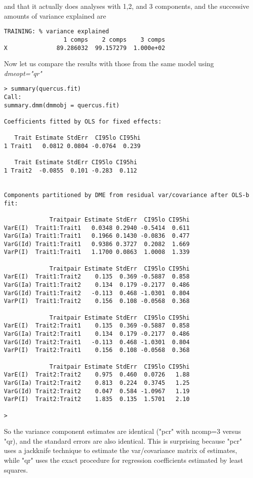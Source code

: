 \documentclass[titlepage]{article}  %
\begin{document}
and that it actually does analyses with 1,2, and 3 components, and the successive amounts of variance explained are

\begin{verbatim}
TRAINING: % variance explained
                 1 comps    2 comps    3 comps
X              89.286032  99.157279  1.000e+02
\end{verbatim}

Now let us compare the results with those from the same model using {\em dmeopt="qr"}

\begin{verbatim}
> summary(quercus.fit)
Call:
summary.dmm(dmmobj = quercus.fit)

Coefficients fitted by OLS for fixed effects:

   Trait Estimate StdErr  CI95lo CI95hi
1 Trait1   0.0812 0.0804 -0.0764  0.239

   Trait Estimate StdErr CI95lo CI95hi
1 Trait2  -0.0855  0.101 -0.283  0.112


Components partitioned by DME from residual var/covariance after OLS-b fit:

             Traitpair Estimate StdErr  CI95lo CI95hi
VarE(I)  Trait1:Trait1   0.0348 0.2940 -0.5414  0.611
VarG(Ia) Trait1:Trait1   0.1966 0.1430 -0.0836  0.477
VarG(Id) Trait1:Trait1   0.9386 0.3727  0.2082  1.669
VarP(I)  Trait1:Trait1   1.1700 0.0863  1.0008  1.339

             Traitpair Estimate StdErr  CI95lo CI95hi
VarE(I)  Trait1:Trait2    0.135  0.369 -0.5887  0.858
VarG(Ia) Trait1:Trait2    0.134  0.179 -0.2177  0.486
VarG(Id) Trait1:Trait2   -0.113  0.468 -1.0301  0.804
VarP(I)  Trait1:Trait2    0.156  0.108 -0.0568  0.368

             Traitpair Estimate StdErr  CI95lo CI95hi
VarE(I)  Trait2:Trait1    0.135  0.369 -0.5887  0.858
VarG(Ia) Trait2:Trait1    0.134  0.179 -0.2177  0.486
VarG(Id) Trait2:Trait1   -0.113  0.468 -1.0301  0.804
VarP(I)  Trait2:Trait1    0.156  0.108 -0.0568  0.368

             Traitpair Estimate StdErr  CI95lo CI95hi
VarE(I)  Trait2:Trait2    0.975  0.460  0.0726   1.88
VarG(Ia) Trait2:Trait2    0.813  0.224  0.3745   1.25
VarG(Id) Trait2:Trait2    0.047  0.584 -1.0967   1.19
VarP(I)  Trait2:Trait2    1.835  0.135  1.5701   2.10

> 
\end{verbatim}

So the variance component estimates are identical ("pcr" with ncomp=3 versus "qr), and the standard errors are also identical. This is surprising  because "pcr" uses a jackknife technique to estimate the var/covariance matrix of estimates, while "qr" uses the exact procedure for regression coefficients estimated by least squares.
\end{document}
